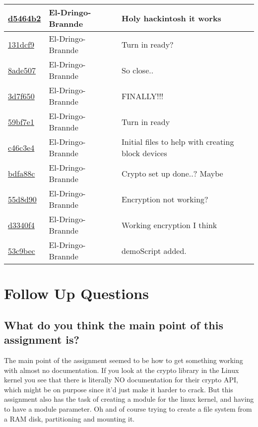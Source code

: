 \documentclass{article}
\begin{document}
\begin{tabular}{l l l}
\href{https://github.com/El-Dringo-Brannde/CS444/commit/d5464b217ad9ba8060fd2f8d129637663bb9ca3a}{d5464b2} & El-Dringo-Brannde & Holy hackintosh it works\\\hline
\href{https://github.com/El-Dringo-Brannde/CS444/commit/131dcf9dd7d9a5064453aa7579bb7d3788197e56}{131dcf9} & El-Dringo-Brannde & Turn in ready?\\\hline
\href{https://github.com/El-Dringo-Brannde/CS444/commit/8ade507f85e8c75df3d536ae1661f14a9d5b8dfe}{8ade507} & El-Dringo-Brannde & So close..\\\hline
\href{https://github.com/El-Dringo-Brannde/CS444/commit/3d7f650ae071d50dc6971de9e1e513812ea66ed7}{3d7f650} & El-Dringo-Brannde & FINALLY!!!\\\hline
\href{https://github.com/El-Dringo-Brannde/CS444/commit/59bf7e123dab0ec117af1d3dd691e5ad19bd0bb8}{59bf7e1} & El-Dringo-Brannde & Turn in ready\\\hline
\href{https://github.com/El-Dringo-Brannde/CS444/commit/c46c3e440a2abcb5f7e84355b5f2edab285e31de}{c46c3e4} & El-Dringo-Brannde & Initial files to help with creating block devices\\\hline
\href{https://github.com/El-Dringo-Brannde/CS444/commit/bdfa88ccb79b211a4c40b5f265821ed239939cec}{bdfa88c} & El-Dringo-Brannde & Crypto set up done..? Maybe\\\hline
\href{https://github.com/El-Dringo-Brannde/CS444/commit/55d8d90d4e46f89dec05ccae1516ca4e5d92b735}{55d8d90} & El-Dringo-Brannde & Encryption not working?\\\hline
\href{https://github.com/El-Dringo-Brannde/CS444/commit/d3340f45a4840a2d1b276dd7cf42580253cc1db4}{d3340f4} & El-Dringo-Brannde & Working encryption I think\\\hline
\href{https://github.com/El-Dringo-Brannde/CS444/commit/53c9bec7d0583d604b5ece65864842ad30888efb}{53c9bec} & El-Dringo-Brannde & demoScript added.\\\hline\end{tabular}


\section{Follow Up Questions}
\subsection{What do you think the main point of this assignment is?}
    The main point of the assignment seemed to be how to get something working with almost no documentation. If you look at the crypto library in the Linux kernel you see that there is literally NO documentation for their crypto API, which might be on purpose since it’d just make it harder to crack.
    But this assignment also has the task of creating a module for the linux kernel, and having to have a module parameter.
    Oh and of course trying to create a file system from a RAM disk, partitioning and mounting it.
\end{document}
